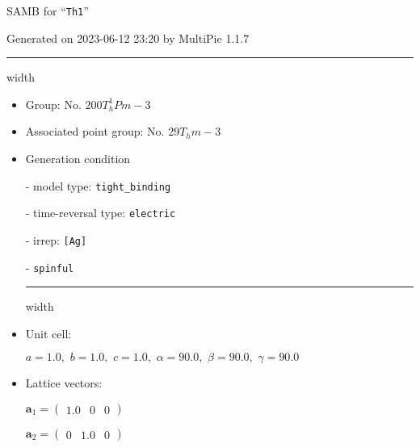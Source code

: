 \documentclass[fleqn,10pt,landscape]{article}
\begin{document}
\setcounter{MaxMatrixCols}{16}

\setlength{\baselineskip}{16pt}
\footnotesize
\begin{center}
\LARGE
SAMB for ``\texttt{Th1}''
\end{center}
\begin{flushright}
Generated on 2023-06-12 23:20 by MultiPie 1.1.7
\end{flushright}
\vspace{1cm}


 \hfil \hrule height 1mm width \textwidth \hfil

\begin{itemize}
\item Group: No. 200\quad$T_{h}^{1}$\quad$Pm-3$\quad[ cubic ]

\item Associated point group: No. 29\quad$T_{h}$\quad$m-3$\quad[ cubic ]

\vspace{5mm}

\item Generation condition

\quad - model type: \texttt{tight_binding}

\quad - time-reversal type: \texttt{electric}

\quad - irrep: \texttt{[Ag]}

\quad - \texttt{spinful}


 \hfil \hrule height 1mm width \textwidth \hfil

\item Unit cell:

\quad $a=1.0,\,\, b=1.0,\,\, c=1.0,\,\, \alpha=90.0,\,\, \beta=90.0,\,\, \gamma=90.0$

\item Lattice vectors:

\quad $\bm{a}_1=\begin{pmatrix} 1.0 & 0 & 0 \end{pmatrix}$

\quad $\bm{a}_2=\begin{pmatrix} 0 & 1.0 & 0 \end{pmatrix}$


\end{itemize}
\end{document}
